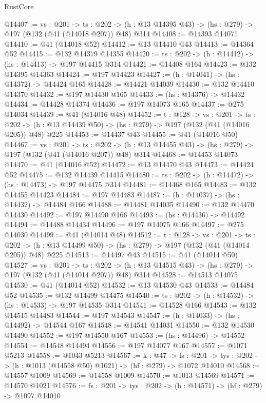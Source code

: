 \begin{lexlean}{RustCore}
\begin{coremodule}
@14407 := {vs : @201} ->
  {ts : @202} -> (h : @13 @14395 @43) -> (hs : @279) -> @197 (@132 (@41 (@14018 @207)) @48) @314
@14408 := @14393 @14071
@14410 := @41 (@14018 @52)
@14412 := @13 @14410 @43
@14413 := @14364 @52
@14415 := @132 @14379 @14355
@14420 := {ts : @202} -> (h : @14412) -> (hs : @14413) -> @197 @14415 @314
@14421 := @14408 @164
@14423 := @132 @14395 @14363
@14424 := @197 @14423
@14427 := (h : @14041) -> (hs : @14372) -> @14424 @165
@14428 := @14421 @14039
@14430 := @132 @14410 @14370
@14432 := @197 @14430 @165
@14433 := (hs : @14376) -> @14432
@14434 := @14428 @14374
@14436 := @197 @14073 @165
@14437 := @275 @14034
@14439 := @41 (@14016 @48)
@14452 := {t : @128} ->
  {vs : @201} ->
  {ts : @202} -> (h : @13 @14439 @50) -> (hs : @279) -> @197 (@132 (@41 (@14016 @205)) @48) @225
@14453 := @14437 @43
@14455 := @41 (@14016 @50)
@14467 := {vs : @201} ->
  {ts : @202} -> (h : @13 @14455 @43) -> (hs : @279) -> @197 (@132 (@41 (@14016 @207)) @48) @314
@14468 := @14453 @14073
@14470 := @41 (@14016 @52)
@14472 := @13 @14470 @43
@14473 := @14424 @52
@14475 := @132 @14439 @14415
@14480 := {ts : @202} -> (h : @14472) -> (hs : @14473) -> @197 @14475 @314
@14481 := @14468 @165
@14483 := @132 @14455 @14423
@14484 := @197 @14483
@14487 := (h : @14037) -> (hs : @14432) -> @14484 @166
@14488 := @14481 @14035
@14490 := @132 @14470 @14430
@14492 := @197 @14490 @166
@14493 := (hs : @14436) -> @14492
@14494 := @14488 @14434
@14496 := @197 @14075 @166
@14497 := @275 @14030
@14499 := @41 (@14014 @48)
@14512 := {t : @128} ->
  {vs : @201} ->
  {ts : @202} -> (h : @13 @14499 @50) -> (hs : @279) -> @197 (@132 (@41 (@14014 @205)) @48) @225
@14513 := @14497 @43
@14515 := @41 (@14014 @50)
@14527 := {vs : @201} ->
  {ts : @202} -> (h : @13 @14515 @43) -> (hs : @279) -> @197 (@132 (@41 (@14014 @207)) @48) @314
@14528 := @14513 @14075
@14530 := @41 (@14014 @52)
@14532 := @13 @14530 @43
@14533 := @14484 @52
@14535 := @132 @14499 @14475
@14540 := {ts : @202} -> (h : @14532) -> (hs : @14533) -> @197 @14535 @314
@14541 := @14528 @166
@14543 := @132 @14515 @14483
@14544 := @197 @14543
@14547 := (h : @14033) -> (hs : @14492) -> @14544 @167
@14548 := @14541 @14031
@14550 := @132 @14530 @14490
@14552 := @197 @14550 @167
@14553 := (hs : @14496) -> @14552
@14554 := @14548 @14494
@14556 := @197 @14077 @167
@14557 := @1071 @5213
@14558 := @1043 @5213
@14567 := {k : @47} ->
  {fs : @201} -> {tys : @202} -> (h : @1013 (@14558 @50) @1021) -> (hf : @279) -> @1072 @14010
@14568 := @14557 @1009
@14569 := @14558 @1009
@14570 := @1013 @14569
@14571 := @14570 @1021
@14576 := {fs : @201} -> {tys : @202} -> (h : @14571) -> (hf : @279) -> @1097 @14010

\end{coremodule}
\end{lexlean}
